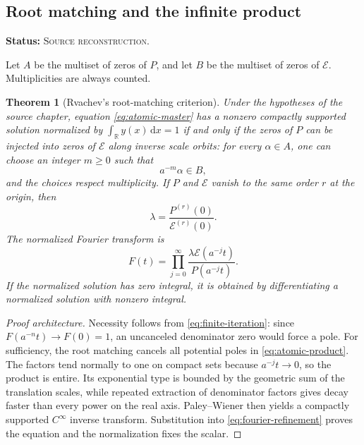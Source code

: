 \documentclass[11pt]{article}
\newtheorem{theorem}{Theorem}[section]
\theoremstyle{definition}
\theoremstyle{remark}
\newcommand{\R}{\mathbb{R}}
\newcommand{\dd}{\,\mathrm{d}}
\newcommand{\SourceStatus}{\textcolor{SourceBlue}{\textsc{Source reconstruction}}}
\newcommand{\status}[1]{\par\smallskip\noindent\textbf{Status:} #1.\par\smallskip}
\begin{document}
\subsection{Root matching and the infinite product}
\status{\SourceStatus}

Let \(A\) be the multiset of zeros of \(P\), and let \(B\) be the multiset of zeros of \(\mathcal E\).  Multiplicities are always counted.

\begin{theorem}[Rvachev's root-matching criterion]
\label{thm:root-matching}
Under the hypotheses of the source chapter, equation \eqref{eq:atomic-master} has a nonzero compactly supported solution normalized by
\(\int_{\R}y(x)\dd x=1\) if and only if the zeros of \(P\) can be injected into zeros of \(\mathcal E\) along inverse scale orbits: for every \(\alpha\in A\), one can choose an integer \(m\ge0\) such that
\begin{equation}
  a^{-m}\alpha\in B,
  \label{eq:root-match}
\end{equation}
and the choices respect multiplicity.  If \(P\) and \(\mathcal E\) vanish to the same order \(r\) at the origin, then
\begin{equation}
  \lambda=\frac{P^{(r)}(0)}{\mathcal E^{(r)}(0)}.
  \label{eq:lambda-origin}
\end{equation}
The normalized Fourier transform is
\begin{equation}
  F(t)=\prod_{j=0}^{\infty}
  \frac{\lambda\mathcal E(a^{-j}t)}{P(a^{-j}t)}.
  \label{eq:atomic-product}
\end{equation}
If the normalized solution has zero integral, it is obtained by differentiating a normalized solution with nonzero integral.
\end{theorem}

\begin{proof}[Proof architecture]
Necessity follows from \eqref{eq:finite-iteration}: since \(F(a^{-n}t)\to F(0)=1\), an uncanceled denominator zero would force a pole.  For sufficiency, the root matching cancels all potential poles in \eqref{eq:atomic-product}.  The factors tend normally to one on compact sets because \(a^{-j}t\to0\), so the product is entire.  Its exponential type is bounded by the geometric sum of the translation scales, while repeated extraction of denominator factors gives decay faster than every power on the real axis.  Paley--Wiener then yields a compactly supported \(C^\infty\) inverse transform.  Substitution into \eqref{eq:fourier-refinement} proves the equation and the normalization fixes the scalar.
\end{proof}
\end{document}
